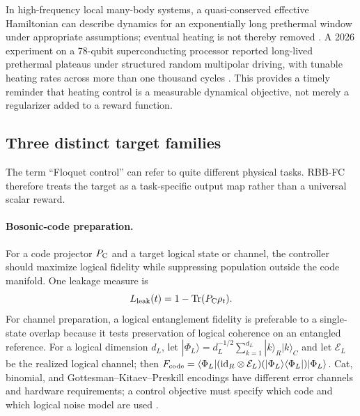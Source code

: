 \documentclass[10pt,twoside]{article}
\DeclareMathOperator{\Tr}{Tr}
\begin{document}
In high-frequency local many-body systems, a quasi-conserved effective Hamiltonian can describe dynamics for an exponentially long prethermal window under appropriate assumptions; eventual heating is not thereby removed \citep{abanin2017effective,ho2023floquetprethermal}. A 2026 experiment on a 78-qubit superconducting processor reported long-lived prethermal plateaus under structured random multipolar driving, with tunable heating rates across more than one thousand cycles \citep{liu2026multipolar}. This provides a timely reminder that heating control is a measurable dynamical objective, not merely a regularizer added to a reward function.

\subsection{Three distinct target families}

The term ``Floquet control'' can refer to quite different physical tasks. RBB-FC therefore treats the target as a task-specific output map rather than a universal scalar reward.

\paragraph{Bosonic-code preparation.} For a code projector $P_{\rm C}$ and a target logical state or channel, the controller should maximize logical fidelity while suppressing population outside the code manifold. One leakage measure is
\begin{equation}
L_{\rm leak}(t)=1-\Tr(P_{\rm C}\rho_t).
\end{equation}
For channel preparation, a logical entanglement fidelity is preferable to a single-state overlap because it tests preservation of logical coherence on an entangled reference. For a logical dimension $d_L$, let $|\Phi_L\rangle=d_L^{-1/2}\sum_{k=1}^{d_L}|k\rangle_R|k\rangle_C$ and let $\mathcal E_L$ be the realized logical channel; then $F_{\rm code}=\langle\Phi_L|(\mathrm{id}_R\otimes\mathcal E_L)(|\Phi_L\rangle\langle\Phi_L|)|\Phi_L\rangle$. Cat, binomial, and Gottesman--Kitaev--Preskill encodings have different error channels and hardware requirements; a control objective must specify which code and which logical noise model are used \citep{brady2024gkp}.
\end{document}
